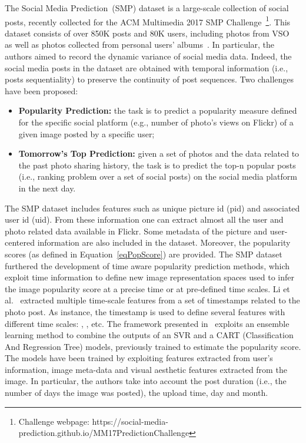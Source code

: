 The Social Media Prediction~(SMP) dataset is a large-scale collection of social posts, recently collected for the ACM Multimedia 2017 SMP Challenge~\footnote{\small Challenge webpage: https://social-media-prediction.github.io/MM17PredictionChallenge}. This dataset consists of over 850K posts and 80K users, including photos from VSO~\cite{borth2013large} as well as photos collected from personal users' albums~\cite{Wu2016TimeMatters,Wu2017DTCN,Wu2016TemporalPrediction}. %
In particular, the authors aimed to record the dynamic variance of social media data. Indeed, the social media posts in the dataset are obtained with temporal information (i.e., posts sequentiality) to preserve the continuity of post sequences.
Two challenges have been proposed:
\begin{itemize}
	\item \textbf{Popularity Prediction:} the task is to predict a popularity measure defined for the specific social platform (e.g., number of photo's views on Flickr) of a given image posted by a specific user;
	\item \textbf{Tomorrow's Top Prediction:} given a set of photos and the data related to the past photo sharing history, the task is to predict the top-n popular posts (i.e., ranking problem over a set of social posts) on the social media platform in the next day.
\end{itemize}
The SMP dataset includes features such as unique picture id (pid) and associated user id (uid). From these information one can extract almost all the user and photo related data available in Flickr. Some metadata of the picture and user-centered information are also included in the dataset. Moreover, the popularity scores (as defined in Equation~\ref{eqPopScore}) are provided. 
The SMP dataset furthered the development of time aware popularity prediction methods, which exploit time information to define new image representation spaces used to infer the image popularity score at a precise time or at pre-defined time scales. 
Li et al.~\cite{li2017hybrid} extracted multiple time-scale features from a set of timestamps related to the photo post. As instance, the timestamp  is used to define several features with different time scales: , , etc.
The framework presented in~\cite{hidayati2017popularity} exploits an ensemble learning method to combine the outputs of an SVR and a CART (Classification And Regression Tree) models, previously trained to estimate the popularity score. The models have been trained by exploiting features extracted from user's information, image meta-data and visual aesthetic features extracted from the image. In particular, the authors take into account the post duration (i.e., the number of days the image was posted), the upload time, day and month.


